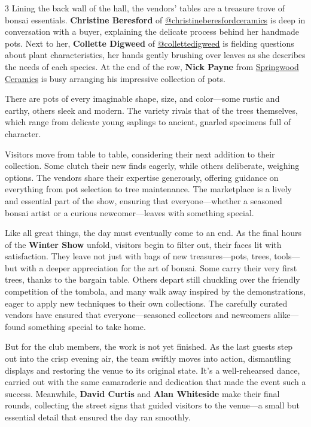 \begin{multicols}{3}
\noindent
Lining the back wall of the hall, the vendors' tables are a treasure trove of bonsai essentials. \textbf{Christine Beresford} of \href{https://www.instagram.com/christineberesfordceramics/}{@christineberesfordceramics} is deep in conversation with a buyer, explaining the delicate process behind her handmade pots. 
Next to her, \textbf{Collette Digweed} of \href{https://www.instagram.com/collettedigweed/}{@collettedigweed} is fielding questions about plant characteristics, her hands gently brushing over leaves as she describes the needs of each species. 
At the end of the row, \textbf{Nick Payne} from \href{https://www.springwoodceramics.com}{Springwood Ceramics} is busy arranging his impressive collection of pots. 

There are pots of every imaginable shape, size, and color---some rustic and earthy, others sleek and modern. 
The variety rivals that of the trees themselves, which range from delicate young saplings to ancient, gnarled specimens full of character.

Visitors move from table to table, considering their next addition to their collection. 
Some clutch their new finds eagerly, while others deliberate, weighing options. 
The vendors share their expertise generously, offering guidance on everything from pot selection to tree maintenance. 
The marketplace is a lively and essential part of the show, ensuring that everyone---whether a seasoned bonsai artist or a curious newcomer---leaves with something special.

\medskip
{}
\noindent
Like all great things, the day must eventually come to an end. 
As the final hours of the \textbf{Winter Show} unfold, visitors begin to filter out, their faces lit with satisfaction. 
They leave not just with bags of new treasures---pots, trees, tools---but with a deeper appreciation for the art of bonsai. 
Some carry their very first trees, thanks to the bargain table. 
Others depart still chuckling over the friendly competition of the tombola, and many walk away inspired by the demonstrations, eager to apply new techniques to their own collections. 
The carefully curated vendors have ensured that everyone---seasoned collectors and newcomers alike---found something special to take home.

But for the club members, the work is not yet finished. 
As the last guests step out into the crisp evening air, the team swiftly moves into action, dismantling displays and restoring the venue to its original state. 
It's a well\--rehearsed dance, carried out with the same camaraderie and dedication that made the event such a success. 
Meanwhile, \textbf{David Curtis} and \textbf{Alan Whiteside} make their final rounds, collecting the street signs that guided visitors to the venue---a small but essential detail that ensured the day ran smoothly.


\end{multicols}
